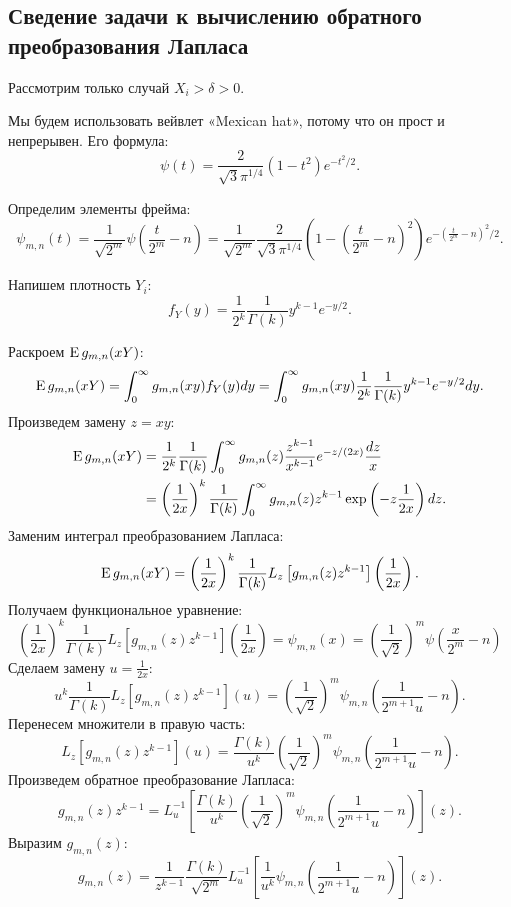\documentclass[../paper.tex]{subfiles}
\begin{document}
\subsection{Сведение задачи к вычислению обратного преобразования Лапласа}
Рассмотрим только случай $X_i > \delta > 0$.

Мы будем использовать вейвлет «Mexican hat», потому что он прост и непрерывен. Его формула:
\[
    \psi(t) = \frac{2}{\sqrt{3} \pi^{1 / 4}} (1-t^2)e^{-t^2 / 2}
.\]

Определим элементы фрейма: \\
\[
    \psi_{m,n}(t) = 
    \frac{1}{\sqrt{2^m}} \psi\left( \frac{t}{2^m}-n \right) =
    \frac{1}{\sqrt{2^m} }\frac{2}{\sqrt{3} \pi^{1 / 4}} \left(1-\left( \frac{t}{2^m} - n \right)^2 \right) e^{-\left( \frac{t}{2^m} - n \right)^2 / 2}
.\]


Напишем плотность $Y_i$:
\[
	f_Y(y) = \frac{1}{2^k} \frac{1}{\Gamma(k)} y^{k-1} e^{-y / 2}
.\]

Раскроем $\operatorname{E} g_{m,n}(xY)$:
\[
	\operatorname{E} g_{m,n}(xY)
	= \int_0^\infty g_{m,n}(xy) f_Y(y) dy
	= \int_0^\infty g_{m,n}(xy) \frac{1}{2^k} \frac{1}{\Gamma(k)} y^{k-1} e^{-y / 2} dy
.\]
Произведем замену $z = xy$:
\begin{align*}
	\operatorname{E} g_{m,n}(xY)
	&= \frac{1}{2^k}\frac{1}{\Gamma(k)} \int_0^\infty g_{m,n}(z) \frac{z^{k-1}}{x^{k-1}} e^{-z/(2x)} \frac{dz}{x}
	\\&= \left(\frac{1}{2x}\right)^k \frac{1}{\Gamma(k)} \int_0^\infty g_{m,n}(z) z^{k-1} \exp\left(-z \frac{1}{2x}\right) dz
.\end{align*}
%
Заменим интеграл преобразованием Лапласа:
\[
	\operatorname{E} g_{m,n}(xY)
	= \left( \frac{1}{2x} \right)^k \frac{1}{\Gamma(k)} L_z \left[g_{m,n}(z) z^{k-1}\right] \left( \frac{1}{2x} \right)
.\]
%
Получаем функциональное уравнение:
\[
	\left( \frac{1}{2x} \right)^k \frac{1}{\Gamma(k)} L_z \left[g_{m,n}(z) z^{k-1}\right] \left( \frac{1}{2x} \right)
	= \psi_{m,n}(x)
	= \left( \frac{1}{\sqrt{2} } \right)^m \psi \left( \frac{x}{2^m} - n \right) 
\]
%
Сделаем замену $u = \frac{1}{2x}$:
\[
    u^k \frac{1}{\Gamma(k)} L_z \left[g_{m,n}(z) z^{k-1}\right] \left( u \right)
    = \left( \frac{1}{\sqrt{2} } \right)^m \psi_{m,n} \left( \frac{1}{2^{m+1} u} - n \right) 
.\]
%
Перенесем множители в правую часть:
\[
    L_z \left[g_{m,n}(z) z^{k-1}\right] \left( u \right)
    = \frac{\Gamma(k)}{u^k} \left( \frac{1}{\sqrt{2} } \right)^m \psi_{m,n} \left( \frac{1}{2^{m+1} u} - n \right)
.\]
%
Произведем обратное преобразование Лапласа:
\[
    g_{m,n}(z) z^{k-1}
    = L^{-1}_u \left[ \frac{\Gamma(k)}{u^k} \left( \frac{1}{\sqrt{2} } \right)^m \psi_{m,n} \left( \frac{1}{2^{m+1} u} - n \right) \right] (z)
.\]
%
Выразим $g_{m,n}(z)$:
\begin{equation}\label{eq:gmn-laplace}
    g_{m,n}(z)
    = \frac{1}{z^{k-1}} \frac{\Gamma(k)}{\sqrt{2^m}} L^{-1}_u \left[ \frac{1}{u^k} \psi_{m,n} \left( \frac{1}{2^{m+1} u} - n \right) \right] (z)
.\end{equation}
\end{document}
